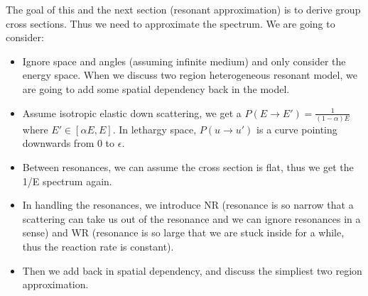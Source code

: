 \documentclass{school-22.211-notes}
\date{February 13, 2012}
\begin{document}
\maketitle


 \label{slowing-down-thermalization}
The goal of this and the next section (resonant approximation) is to derive group cross sections. Thus we need to approximate the spectrum. We are going to consider: 
\begin{itemize}
\item Ignore space and angles (assuming infinite medium) and only consider the energy space. When we discuss two region heterogeneous resonant model, we are going to add some spatial dependency back in the model. 
\item Assume isotropic elastic down scattering, we get a $P(E\to E') = \frac{1}{(1-\alpha)E}$ where $E' \in [\alpha E, E]$. In lethargy space, $P(u\to u')$ is a curve pointing downwards from $0$ to $\epsilon$. 
\item Between resonances, we can assume the cross section is flat, thus we get the 1/E spectrum again. 
\item In handling the resonances, we introduce NR (resonance is so narrow that a scattering can take us out of the resonance and we can ignore resonances in a sense) and WR (resonance is so large that we are stuck inside for a while, thus the reaction rate is constant). 
\item Then we add back in spatial dependency, and discuss the simpliest two region approximation.
\end{itemize}
\end{document}
